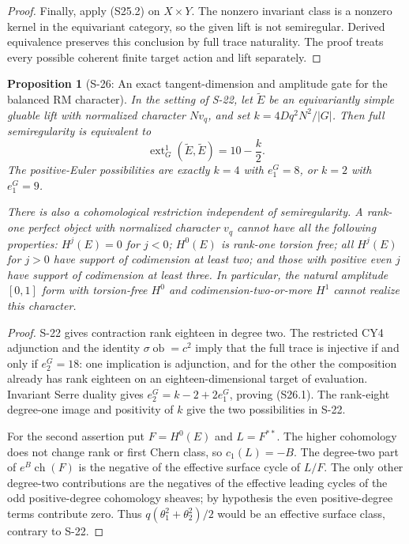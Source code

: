 \documentclass[11pt,a4paper]{article}
\newtheorem{proposition}[theorem]{Proposition}
\theoremstyle{definition}
\begin{document}
\begin{proof}
Finally, apply (S25.2) on $X\times Y$. The nonzero
invariant class is a nonzero kernel in the equivariant
category, so the given lift is not semiregular. Derived
equivalence preserves this conclusion by full trace
naturality. The proof treats every possible coherent
finite target action and lift separately.
\end{proof}

\begin{proposition}[S-26: An exact tangent-dimension and amplitude gate for the balanced RM character]
\label{prop:semireg-rm-tangent-gate}
In the setting of S-22, let $\widetilde E$ be an
equivariantly simple gluable lift with normalized
character $Nv_q$, and set
$k=4Dq^2N^2/|G|$.
Then full semiregularity is equivalent to
\[
 \operatorname{ext}^1_G(\widetilde E,\widetilde E)
        =10-\frac{k}{2}.
 \tag{S26.1}
\]
The positive-Euler possibilities are exactly $k=4$ with
$e_1^G=8$, or $k=2$ with $e_1^G=9$.

There is also a cohomological restriction independent of
semiregularity. A rank-one perfect object with normalized
character $v_q$ cannot have all the following properties:
$H^j(E)=0$ for $j<0$; $H^0(E)$ is rank-one torsion free;
all $H^j(E)$ for $j>0$ have support of codimension at least
two; and those with positive even $j$ have support of
codimension at least three. In particular, the natural
amplitude $[0,1]$ form with torsion-free $H^0$ and
codimension-two-or-more $H^1$ cannot realize this character.
\end{proposition}
\begin{proof}
S-22 gives contraction rank eighteen in degree two.
The restricted CY4 adjunction and the identity
$\sigma\operatorname{ob}=c^2$ imply that the full trace
is injective if and only if $e_2^G=18$: one implication
is adjunction, and for the other the composition already
has rank eighteen on an eighteen-dimensional target
of evaluation. Invariant Serre duality gives
$e_2^G=k-2+2e_1^G$, proving (S26.1).
The rank-eight degree-one image and positivity of $k$
give the two possibilities in S-22.

For the second assertion put $F=H^0(E)$ and
$L=F^{**}$. The higher cohomology does not change rank
or first Chern class, so $c_1(L)=-B$.
The degree-two part of $e^B\operatorname{ch}(F)$ is the
negative of the effective surface cycle of $L/F$.
The only other degree-two contributions are the negatives
of the effective leading cycles of the odd positive-degree
cohomology sheaves; by hypothesis the even positive-degree
terms contribute zero. Thus
$q(\theta_1^2+\theta_2^2)/2$ would be an effective
surface class, contrary to S-22.
\end{proof}
\end{document}
